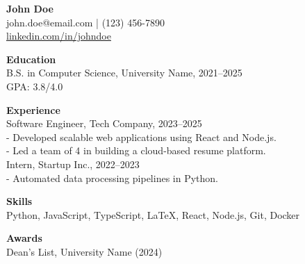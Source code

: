 \documentclass[11pt]{article}
\begin{document}
\begin{center}
    {\LARGE \textbf{John Doe}} \\
    john.doe@email.com \quad | \quad (123) 456-7890 \\
    \href{https://linkedin.com/in/johndoe}{linkedin.com/in/johndoe}
\end{center}

\vspace{4mm}

\textbf{Education} \\
B.S. in Computer Science, University Name, 2021--2025 \\
GPA: 3.8/4.0

\vspace{2mm}

\textbf{Experience} \\
Software Engineer, Tech Company, 2023--2025 \\
- Developed scalable web applications using React and Node.js. \\
- Led a team of 4 in building a cloud-based resume platform. \\

Intern, Startup Inc., 2022--2023 \\
- Automated data processing pipelines in Python. \\

\vspace{2mm}

\textbf{Skills} \\
Python, JavaScript, TypeScript, LaTeX, React, Node.js, Git, Docker

\vspace{2mm}

\textbf{Awards} \\
Dean's List, University Name (2024)
\end{document}

